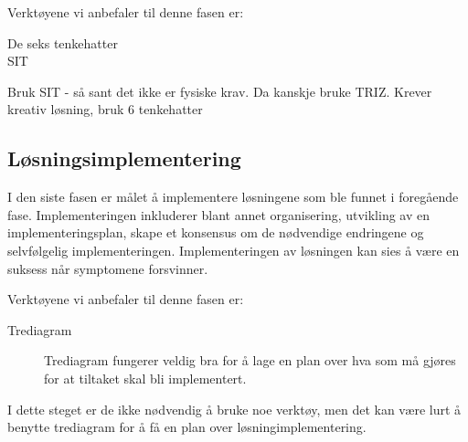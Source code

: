 Verktøyene vi anbefaler til denne fasen er:
\begin{description}
    \item[De seks tenkehatter]
    \item[SIT] 
\end{description}
Bruk SIT - så sant det ikke er fysiske krav. Da kanskje bruke TRIZ. 
Krever kreativ løsning, bruk 6 tenkehatter

\subsection{Løsningsimplementering}
I den siste fasen er målet å implementere løsningene som ble funnet i foregående fase. Implementeringen inkluderer blant annet organisering, utvikling av en implementeringsplan, skape et konsensus om de nødvendige endringene og selvfølgelig implementeringen. Implementeringen av løsningen kan sies å være en suksess når symptomene forsvinner. 

Verktøyene vi anbefaler til denne fasen er:
\begin{description}
    \item[Trediagram] Trediagram fungerer veldig bra for å lage en plan over hva som må gjøres for at tiltaket skal bli implementert. 
\end{description}
I dette steget er de ikke nødvendig å bruke noe verktøy, men det kan være lurt å benytte trediagram for å få en plan over løsningimplementering.

